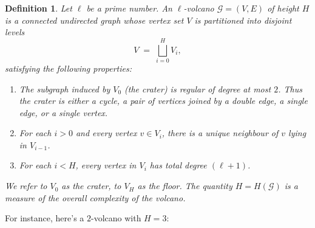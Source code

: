 \documentclass[table]{amsart}
\newtheorem{definition}[theorem]{Definition}
\numberwithin{equation}{section}
\begin{document}
\begin{definition}
Let $\ell$ be a prime number. An \emph{$\ell$-volcano} $\mathcal{G}=(V,E)$ of height $H$ is a connected undirected graph whose vertex set $V$ is partitioned into disjoint levels
\[
V \;=\; \bigsqcup_{i=0}^H V_i,
\]
satisfying the following properties:
\begin{enumerate}
    \item The subgraph induced by $V_0$ (the \emph{crater}) is regular of degree at most $2$. Thus the crater is either a cycle, a pair of vertices joined by a double edge, a single edge, or a single vertex.
    \item For each $i>0$ and every vertex $v\in V_i$, there is a unique neighbour of $v$ lying in $V_{i-1}$.
    \item For each $i<H$, every vertex in $V_i$ has total degree $(\ell+1)$.
\end{enumerate}
We refer to $V_0$ as the \emph{crater}, to $V_H$ as the \emph{floor}. The quantity $H=H(\mathcal{G})$ is a measure of the overall complexity of the volcano. 
\end{definition}
\noindent For instance, here's a $2$-volcano with $H=3$:
\end{document}
